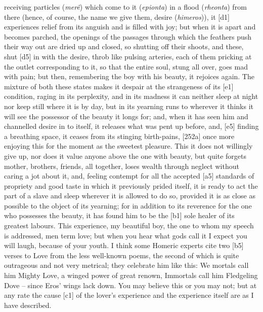 receiving particles ({\em merê}) which come to it ({\em epionta}) in a
flood ({\em rheonta}) from there (hence, of course, the name we give
them, desire
({\em himeros})), it
{[}d1{]} experiences relief from its anguish and is filled with joy; but
when it is apart and becomes parched, the openings of the passages
through which the feathers push their way out are dried up and closed,
so shutting off their shoots, and these, shut {[}d5{]} in with the
desire, throb like
pulsing arteries, each of them pricking at the outlet corresponding to
it, so that the entire soul, stung all over, goes mad with pain; but
then, remembering the boy with his
beauty, it rejoices
again. The mixture of both these states makes it despair at the
strangeness of its {[}e1{]} condition, raging in its perplexity, and in
its madness it can neither sleep at night nor keep still where it is by
day, but in its yearning runs to wherever it thinks it will see the
possessor of the beauty it longs for; and, when it has seen him and
channelled desire in to
itself, it releases what was pent up before, and, {[}e5{]} finding a
breathing space, it ceases from its stinging birth-pains, {[}252a{]}
once more enjoying this for the moment as the sweetest pleasure. This it
does not willingly give up, nor does it value anyone above the one with
beauty, but quite forgets mother, brothers, friends, all together, loses
wealth through neglect without caring a jot about it, and, feeling
contempt for all the accepted {[}a5{]} standards of propriety and good
taste in which it previously prided itself, it is ready to act the part
of a slave and sleep wherever it is allowed to do so, provided it is as
close as possible to the object of its yearning; for in addition to its
reverence for the one who possesses the beauty, it has found him to be
the {[}b1{]} sole healer of its greatest labours. This experience, my
beautiful boy, the one to whom my speech is addressed, men term love;
but when you hear what gods call it I expect you will laugh, because of
your youth. I think some Homeric experts cite two {[}b5{]} verses to
Love from the less well-known poems, the second of which is quite
outrageous and not very metrical; they celebrate him like this: We
mortals call him Mighty Love, a winged power of great renown, Immortals
call him Fledgeling Dove -- since Eros' wings lack
down. You may believe
this or you may not; but at any rate the cause {[}c1{]} of the lover's
experience and the experience itself are as I have described.

